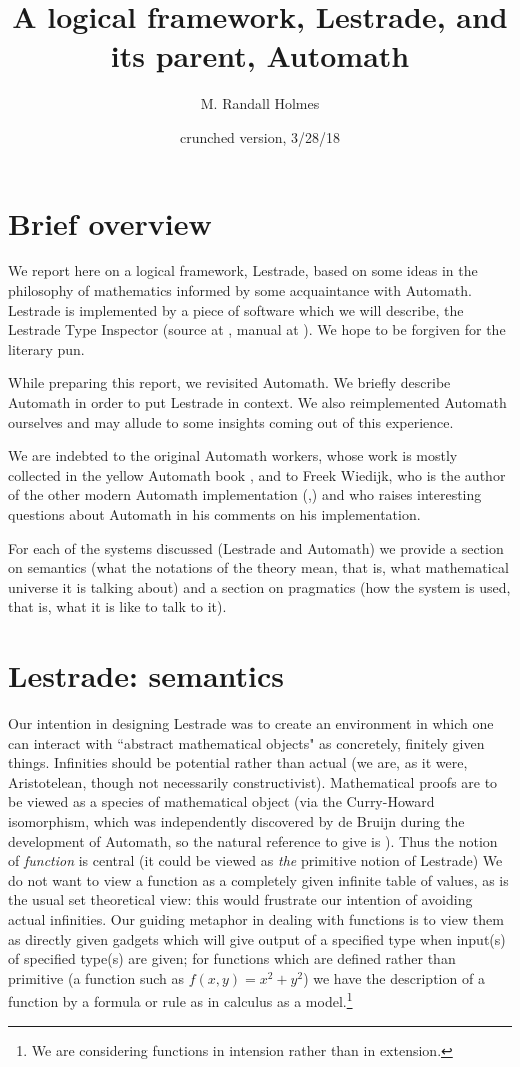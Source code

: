 \documentclass{article}
\title{A logical framework, Lestrade, and its parent, Automath}
\author{M. Randall Holmes}
\date{crunched version, 3/28/18}
\begin{document}
\maketitle

\section{Brief overview}

We report here on a logical framework, Lestrade, based on some ideas in the philosophy of mathematics informed by some acquaintance with Automath.  Lestrade is implemented by a piece of software which we will describe, the Lestrade Type Inspector (source at \cite{lestradesource}, manual at \cite{lestrademanual}).  We hope to be forgiven for the literary pun.

While preparing this report, we revisited Automath.  We briefly describe Automath in order to put Lestrade in context.  We also reimplemented Automath ourselves and may allude to some insights coming out of this experience.

We are indebted to the original Automath workers, whose work is mostly collected in the yellow Automath book \cite{yellowbook}, and to Freek Wiedijk, who is the  author of the other modern Automath implementation (\cite{autmanual},\cite{autpaper}) and who raises  interesting questions about Automath in his comments on  his implementation.

For each of the systems discussed (Lestrade and Automath) we provide a section on semantics (what the notations of the theory mean, that is, what mathematical universe it is talking about) and a section on pragmatics (how the system is used, that is, what it is like to talk to it).

\section{Lestrade:  semantics}

 Our intention in designing Lestrade was to create an environment in which one can interact with ``abstract mathematical objects"  as concretely, finitely given things.  Infinities should be potential rather than actual (we are, as it were, Aristotelean, though not necessarily constructivist).  Mathematical proofs are to be viewed as a species of mathematical object (via the Curry-Howard isomorphism, which was independently discovered by de Bruijn during the development of Automath, so the natural reference to give is \cite{debruijna2}).  Thus the notion of {\em function\/} is central (it could be viewed as {\em the\/} primitive notion of Lestrade)  We do not want to view a function as a completely given infinite table of values, as is the usual set theoretical view:  this would frustrate our intention of avoiding actual infinities.  Our guiding metaphor in dealing with functions is to view them as directly given gadgets which will give output of a specified type when input(s) of specified type(s) are given;  for functions which are defined rather than primitive (a function such as $f(x,y)=x^2+y^2$) we have the description of a function by a formula or rule as in calculus as a model.\footnote{We are considering functions in intension rather than in extension.}
\end{document}
